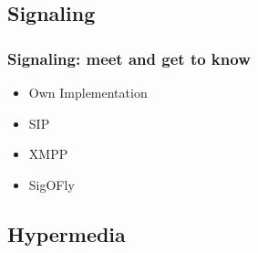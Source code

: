 \documentclass[compress]{beamer}
\begin{document}
	\subsection{Signaling}
  		\begin{frame}[c]
		\frametitle{Signaling: meet and get to know}
		\begin{itemize}
		\item Own Implementation
		\vfill
		\item SIP
		\vfill
		\item XMPP
		\vfill
		\item SigOFly
		\end{itemize}
		\end{frame}



	\subsection{Hypermedia}
\end{document}
